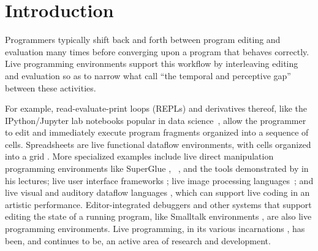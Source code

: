 \vspace{-7px}
\newcommand{\introSec}{Introduction}
\section{\protect\introSec} %
\label{sec:intro}


Programmers typically shift back and forth between program editing and evaluation many times before converging upon a program that behaves correctly. 
Live programming environments support this workflow by interleaving editing and evaluation so as to   
narrow what \citet{burckhardt2013s} call ``the temporal and perceptive gap'' between these activities.

For example, read-evaluate-print loops (REPLs) and derivatives thereof, like the IPython/Jupyter lab notebooks popular in data science~\cite{PER-GRA:2007}, allow the programmer to edit and immediately execute program fragments organized into a sequence of cells. 
Spreadsheets are live functional dataflow environments, with cells organized into a grid \cite{DBLP:journals/jfp/Wakeling07}. 
More specialized examples include live direct manipulation programming environments like SuperGlue
\cite{McDirmid:2007}, \sns{}~\cite{sns-pldi,sns-uist}, and the tools
demonstrated by \citet{victor2012inventing} in his lectures;
%
live user interface frameworks \cite{burckhardt2013s};
%
live image processing languages~\cite{DBLP:journals/vlc/Tanimoto90};
%
and live visual and auditory dataflow languages \cite{DBLP:conf/vl/BurnettAW98}, which can support live coding in an artistic performance.
Editor-integrated debuggers \cite{mccauley2008debugging} and other systems that support editing the state of a running program, like Smalltalk environments \cite{Goldberg:1983cn}, are also live programming environments. 
Live programming, in its various incarnations \cite{DBLP:journals/vlc/Tanimoto90,DBLP:conf/icse/Tanimoto13},
has been, and continues to be, an active area of research and development.

